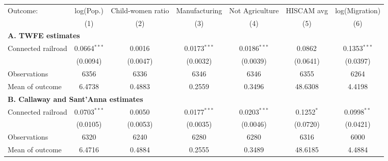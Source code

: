 \begin{tabular}{lcccccc}
  \toprule
  Outcome: & log(Pop.) & Child-women ratio & Manufacturing & Not Agriculture & HISCAM avg & log(Migration) \\
           & (1) & (2) & (3) & (4) & (5) & (6) \\
  \midrule
  \multicolumn{7}{l}{\textbf{A. TWFE estimates}}\\
  Connected railroad &  0.0664$^{***}$ & 0.0016$^{}$ & 0.0173$^{***}$ & 0.0186$^{***}$ & 0.0862$^{}$ & 0.1353$^{***}$  \\
                    &  (0.0094) & (0.0047) & (0.0032) & (0.0039) & (0.0641) & (0.0397)  \\
  \cmidrule(lr){2-7}
  Observations      &  6356 & 6336 & 6346 & 6346 & 6355 & 6264  \\
  Mean of outcome   &  6.4738 & 0.4883 & 0.2559 & 0.3496 & 48.6308 & 4.4198  \\
  \midrule
  \multicolumn{7}{l}{\textbf{B. Callaway and Sant'Anna estimates}}\\
  Connected railroad &  0.0703$^{***}$ & 0.0050$^{}$ & 0.0177$^{***}$ & 0.0203$^{***}$ & 0.1252$^{*}$ & 0.0998$^{**}$  \\
                    &  (0.0105) & (0.0053) & (0.0035) & (0.0046) & (0.0720) & (0.0421)  \\
  \cmidrule(lr){2-7}
  Observations      &  6320 & 6240 & 6280 & 6280 & 6316 & 6000  \\
  Mean of outcome   &  6.4716 & 0.4884 & 0.2555 & 0.3489 & 48.6185 & 4.4884  \\
  \bottomrule
\end{tabular}

